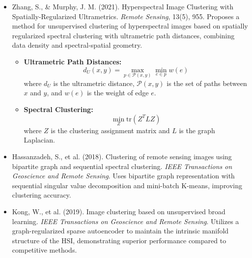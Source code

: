 \documentclass[10pt,svgnames,fragile]{beamer}
\begin{document}
\begin{frame}{}
\tiny
\begin{itemize}

\item Zhang, S., \& Murphy, J. M. (2021). Hyperspectral Image Clustering with Spatially-Regularized Ultrametrics. \textit{Remote Sensing}, 13(5), 955. \href{https://doi.org/10.3390/rs13050955}{\color{blue}{DOI: 10.3390/rs13050955}}
{\color{gray}Proposes a method for unsupervised clustering of hyperspectral images based on spatially regularized spectral clustering with ultrametric path distances, combining data density and spectral-spatial geometry.}
\begin{itemize} \tiny
    \item \textbf{Ultrametric Path Distances:}
    \[
    d_U(x, y) = \max_{p \in \mathcal{P}(x,y)} \min_{e \in p} w(e)
    \]
    where \(d_U\) is the ultrametric distance, \(\mathcal{P}(x,y)\) is the set of paths between \(x\) and \(y\), and \(w(e)\) is the weight of edge \(e\).
    \item \textbf{Spectral Clustering:}
    \[
    \min_{Z} \text{tr}(Z^T L Z)
    \]
    where \(Z\) is the clustering assignment matrix and \(L\) is the graph Laplacian.
\end{itemize}

\end{itemize}
\end{frame}
\begin{frame}{}
\tiny
\begin{itemize}

\item Hassanzadeh, S., et al. (2018). Clustering of remote sensing images using bipartite graph and sequential spectral clustering. \textit{IEEE Transactions on Geoscience and Remote Sensing}. \href{https://consensus.app/papers/clustering-remote-sensing-image-bipartite-graph-hassanzadeh/115ee7fd679d5367bcbcefadef405790/?utm_source=chatgpt}{\color{blue}{DOI: 10.1109/TGRS.2018.2851521}}
{\color{gray}Uses bipartite graph representation with sequential singular value decomposition and mini-batch K-means, improving clustering accuracy.}

\item Kong, W., et al. (2019). Image clustering based on unsupervised broad learning. \textit{IEEE Transactions on Geoscience and Remote Sensing}. \href{https://consensus.app/papers/image-clustering-based-unsupervised-broad-learning-kong/bd37a867eda05ba890787dd4a9763cac/?utm_source=chatgpt}{\color{blue}{DOI: 10.1109/TGRS.2019.2901657}}
{\color{gray}Utilizes a graph-regularized sparse autoencoder to maintain the intrinsic manifold structure of the HSI, demonstrating superior performance compared to competitive methods.}

\end{itemize}
\end{frame}
\end{document}
